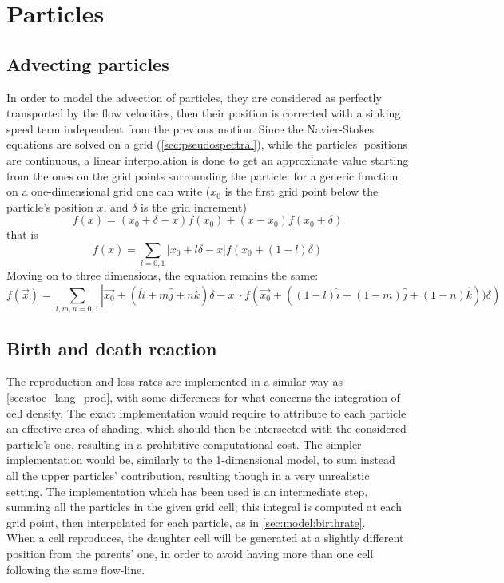 \section{Particles}

\subsection{Advecting particles} \label{sec:lag_part_adv}
In order to model the advection of particles, they are considered as perfectly transported by the flow velocities, then their position is corrected with a sinking speed term independent from the previous motion. Since the Navier-Stokes equations are solved on a grid (\autoref{sec:pseudospectral}), while the particles' positions are continuous, a linear interpolation is done to get an approximate value starting from the ones on the grid points surrounding the particle: for a generic function on a one-dimensional grid one can write ($x_0$ is the first grid point below the particle's position $x$, and $\delta$ is the grid increment)
\[ f(x) = (x_0+\delta - x)f(x_0) + (x-x_0)f(x_0+\delta) \]
that is 
\begin{equation}
    f(x) = \sum_{l=0,1} |x_0+l\delta - x|f(x_0+(1-l)\delta)
\end{equation}
Moving on to three dimensions, the equation remains the same:
\begin{equation}
f(\vec{x}) =
           \sum_{l,m,n=0,1} 
        \left| \vec{x_0}+(l\hat{i}+m\hat{j}+n\hat{k})\delta - x \right | \cdot 
        f\left(\vec{x_0}+
        \left( (1-l)\hat{i} + (1-m)\hat{j} + (1-n)\hat{k} \right))\delta\right)
\end{equation}



\subsection{Birth and death reaction} \label{sec:lag_part_react}
The reproduction and loss rates are implemented in a similar way as \autoref{sec:stoc_lang_prod}, with some differences for what concerns the integration of cell density. The exact implementation would require to attribute to each particle an effective area of shading, which should then be intersected with the considered particle's one, resulting in a prohibitive computational cost. The simpler implementation would be, similarly to the 1-dimensional model, to sum instead all the upper particles' contribution, resulting though in a very unrealistic setting.
The implementation which has been used is an intermediate step, summing all the particles in the given grid cell; this integral is computed at each grid point, then interpolated for each particle, as in \autoref{sec:model:birthrate}. \\
When a cell reproduces, the daughter cell will be generated at a slightly different position from the parents' one, in order to avoid having more than one cell following the same flow-line. 



